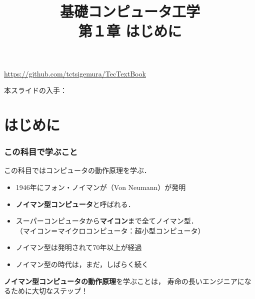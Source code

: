 \documentclass{beamer}                 %
\begin{document}
\title{基礎コンピュータ工学\\第１章 はじめに}
\date{}

\begin{frame}
  \titlepage
  \centerline{\url{https://github.com/tctsigemura/TecTextBook}}
  \vfill
  \centerline{本スライドの入手：
    }
\end{frame}


\section{はじめに}
\begin{frame}
  \frametitle{この科目で学ぶこと}
  この科目ではコンピュータの動作原理を学ぶ．
  \vfill
  \begin{itemize}
  \item 1946年にフォン・ノイマンが（Von Neumann）が発明
  \item {\bf ノイマン型コンピュータ}と呼ばれる．
  \item スーパーコンピュータから{\bf マイコン}まで全てノイマン型．\\
    （マイコン＝マイクロコンピュータ：超小型コンピュータ）
  \item ノイマン型は発明されて70年以上が経過
  \item ノイマン型の時代は，まだ，しばらく続く
  \end{itemize}
  \vfill
  {\bf ノイマン型コンピュータの動作原理}を学ぶことは，
  寿命の長いエンジニアになるために大切なステップ！
\end{frame}
\end{document}
